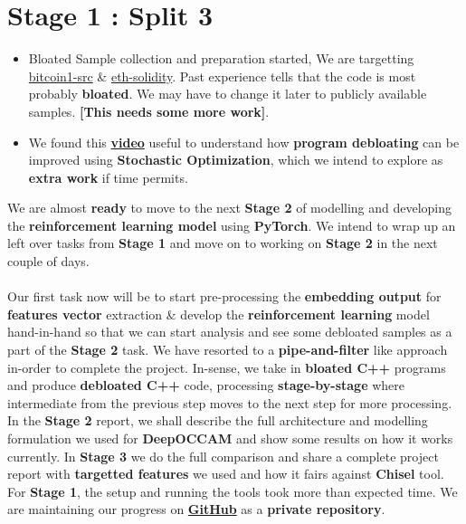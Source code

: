\documentclass{article} %
\begin{document}
\section*{\color{darkmidnightblue} Stage 1 : Split 3}
\begin{itemize}
	\item Bloated Sample collection and preparation started, We are targetting \href{https://github.com/bitcoin/bitcoin}{bitcoin1-src} \& \href{https://github.com/ethereum/solidity}{eth-solidity}. Past experience tells that the code is most probably \textbf{bloated}. We may have to change it later to publicly available samples. \textbf{\color{red}[This needs some more work]}.
	\item We found this \textbf{\href{https://www.youtube.com/watch?v=hC4zIwyv1bg}{video}} useful to understand how \textbf{program debloating} can be improved using \textbf{Stochastic Optimization}, which we intend to explore as \textbf{extra work} if time permits.
\end{itemize}

We are almost \textbf{\color{ao(english)}ready} to move to the next \textbf{Stage 2} of modelling and developing the \textbf{\color{ao(english)} reinforcement learning model} using \textbf{PyTorch}. We intend to wrap up an left over tasks from \textbf{Stage 1} and move on to working on \textbf{Stage 2} in the next couple of days. \\  \\
Our first task now will be to start pre-processing the \textbf{\color{ao(english)} embedding output} for \textbf{\color{ao(english)} features vector} extraction \& develop the \textbf{\color{ao(english)}reinforcement learning} model hand-in-hand so that we can start analysis and see some debloated samples as a part of the \textbf{Stage 2} task. We have resorted to a \textbf{pipe-and-filter} like approach in-order to complete the project. In-sense, we take in \textbf{\color{red} bloated C++} programs and produce \textbf{\color{ao(english)} debloated C++} code, processing \textbf{stage-by-stage} where intermediate from the previous step moves to the next step for more processing. \\ 

In the \textbf{Stage 2} report, we shall describe the full architecture and modelling formulation we used for \textbf{DeepOCCAM} and show some results on how it works currently. In \textbf{Stage 3} we do the full comparison and share a complete project report with \textbf{targetted features} we used and how it fairs against \textbf{Chisel} tool.  For \textbf{Stage 1}, the setup and running the tools took more than expected time. We are maintaining our progress on \textbf{\href{https://github.com/lahiri-phdworks/reinforcedlearning-debloater} {GitHub}} as a \textbf{private repository}.
\end{document}
